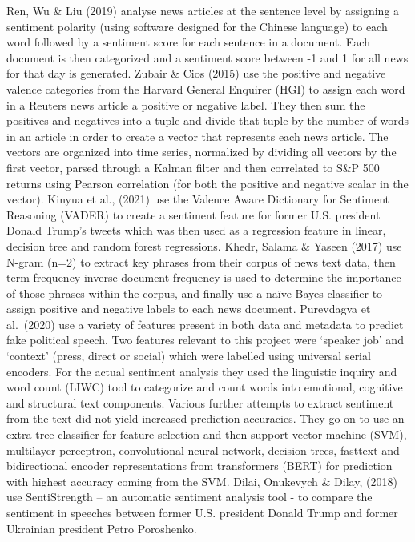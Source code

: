 \documentclass[11pt,preprint, authoryear]{elsarticle}
\numberwithin{equation}{section}
\numberwithin{figure}{section}
\numberwithin{table}{section}
\begin{document}
Ren, Wu \& Liu (2019) analyse news articles at the sentence level by
assigning a sentiment polarity (using software designed for the Chinese
language) to each word followed by a sentiment score for each sentence
in a document. Each document is then categorized and a sentiment score
between -1 and 1 for all news for that day is generated. Zubair \& Cios
(2015) use the positive and negative valence categories from the Harvard
General Enquirer (HGI) to assign each word in a Reuters news article a
positive or negative label. They then sum the positives and negatives
into a tuple and divide that tuple by the number of words in an article
in order to create a vector that represents each news article. The
vectors are organized into time series, normalized by dividing all
vectors by the first vector, parsed through a Kalman filter and then
correlated to S\&P 500 returns using Pearson correlation (for both the
positive and negative scalar in the vector). Kinyua et al., (2021) use
the Valence Aware Dictionary for Sentiment Reasoning (VADER) to create a
sentiment feature for former U.S. president Donald Trump's tweets which
was then used as a regression feature in linear, decision tree and
random forest regressions. Khedr, Salama \& Yaseen (2017) use N-gram
(n=2) to extract key phrases from their corpus of news text data, then
term-frequency inverse-document-frequency is used to determine the
importance of those phrases within the corpus, and finally use a
naïve-Bayes classifier to assign positive and negative labels to each
news document. Purevdagva et al.~(2020) use a variety of features
present in both data and metadata to predict fake political speech. Two
features relevant to this project were `speaker job' and `context'
(press, direct or social) which were labelled using universal serial
encoders. For the actual sentiment analysis they used the linguistic
inquiry and word count (LIWC) tool to categorize and count words into
emotional, cognitive and structural text components. Various further
attempts to extract sentiment from the text did not yield increased
prediction accuracies. They go on to use an extra tree classifier for
feature selection and then support vector machine (SVM), multilayer
perceptron, convolutional neural network, decision trees, fasttext and
bidirectional encoder representations from transformers (BERT) for
prediction with highest accuracy coming from the SVM. Dilai, Onukevych
\& Dilay, (2018) use SentiStrength -- an automatic sentiment analysis
tool - to compare the sentiment in speeches between former U.S.
president Donald Trump and former Ukrainian president Petro Poroshenko.
\end{document}
